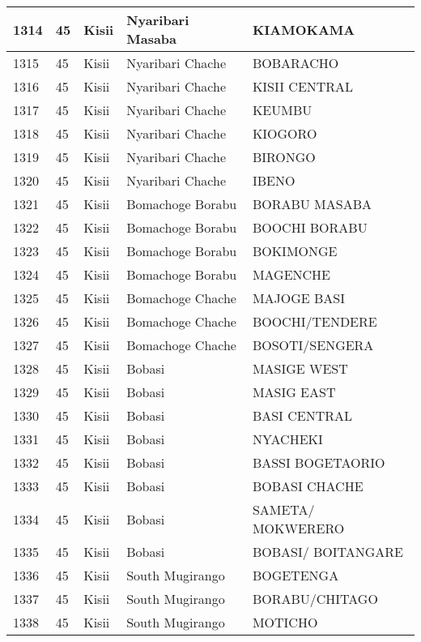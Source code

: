 \begin{table}[!ht]
\begin{tabular}{|l|l|l|l|l|}
        1314 & 45 & Kisii & Nyaribari Masaba & KIAMOKAMA \\ \hline
        1315 & 45 & Kisii & Nyaribari Chache & BOBARACHO \\ \hline
        1316 & 45 & Kisii & Nyaribari Chache & KISII CENTRAL \\ \hline
        1317 & 45 & Kisii & Nyaribari Chache & KEUMBU \\ \hline
        1318 & 45 & Kisii & Nyaribari Chache & KIOGORO \\ \hline
        1319 & 45 & Kisii & Nyaribari Chache & BIRONGO \\ \hline
        1320 & 45 & Kisii & Nyaribari Chache & IBENO \\ \hline
        1321 & 45 & Kisii & Bomachoge Borabu & BORABU MASABA \\ \hline
        1322 & 45 & Kisii & Bomachoge Borabu & BOOCHI BORABU \\ \hline
        1323 & 45 & Kisii & Bomachoge Borabu & BOKIMONGE \\ \hline
        1324 & 45 & Kisii & Bomachoge Borabu & MAGENCHE \\ \hline
        1325 & 45 & Kisii & Bomachoge Chache & MAJOGE BASI \\ \hline
        1326 & 45 & Kisii & Bomachoge Chache & BOOCHI/TENDERE \\ \hline
        1327 & 45 & Kisii & Bomachoge Chache & BOSOTI/SENGERA \\ \hline
        1328 & 45 & Kisii & Bobasi & MASIGE WEST \\ \hline
        1329 & 45 & Kisii & Bobasi & MASIG EAST \\ \hline
        1330 & 45 & Kisii & Bobasi & BASI CENTRAL \\ \hline
        1331 & 45 & Kisii & Bobasi & NYACHEKI \\ \hline
        1332 & 45 & Kisii & Bobasi & BASSI BOGETAORIO \\ \hline
        1333 & 45 & Kisii & Bobasi & BOBASI CHACHE \\ \hline
        1334 & 45 & Kisii & Bobasi & SAMETA/ MOKWERERO \\ \hline
        1335 & 45 & Kisii & Bobasi & BOBASI/ BOITANGARE \\ \hline
        1336 & 45 & Kisii & South Mugirango & BOGETENGA \\ \hline
        1337 & 45 & Kisii & South Mugirango & BORABU/CHITAGO \\ \hline
        1338 & 45 & Kisii & South Mugirango & MOTICHO \\ \hline

\end{tabular}
\end{table}
